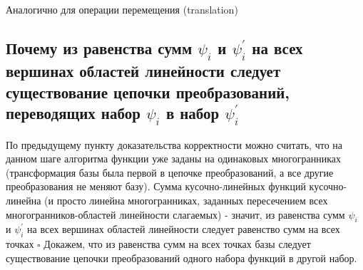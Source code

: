 \documentclass[16pt]{article}
\begin{document}
Аналогично для операции перемещения (translation)

\subsection{Почему из равенства сумм $\psi_i$ и $\psi_i^{'}$ на всех  вершинах областей линейности следует существование цепочки преобразований, переводящих набор $\psi_i$ в набор $\psi_i^{'}$}
По предыдущему пункту доказательства корректности можно считать, что на данном шаге алгоритма функции уже заданы на одинаковых многогранниках (трансформация базы была первой в цепочке преобразований, а все другие преобразования не меняют базу). Сумма кусочно-линейных функций кусочно-линейна (и просто линейна многогранниках, заданных пересечением всех многогранников-областей линейности слагаемых) - значит, из равенства сумм $\psi_i$ и $\psi_i^{'}$ на всех  вершинах областей линейности следует равенство сумм на всех точках $\square$
Докажем, что из равенства сумм на всех точках базы следует существование цепочки преобразований одного набора функций в другой набор.
\end{document}
